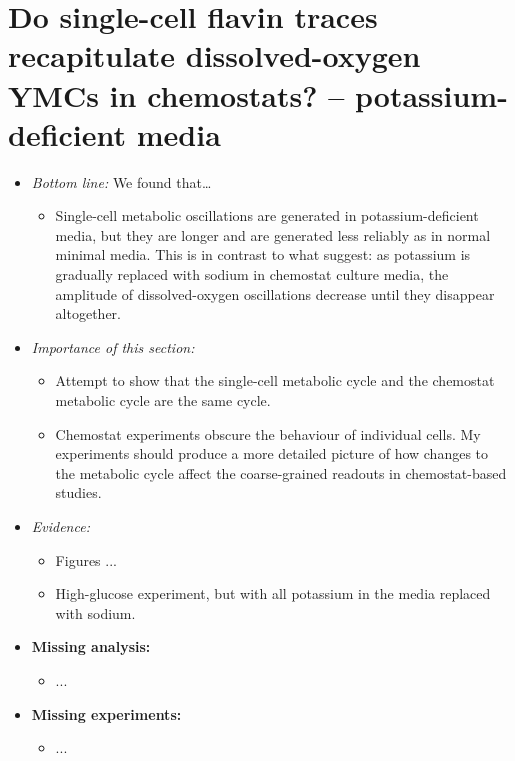 \section{Do single-cell flavin traces recapitulate dissolved-oxygen YMCs in chemostats? -- potassium-deficient media}
\label{sec:biology-potassium_deficient}
\begin{itemize}
\item \emph{Bottom line:} We found that\ldots{}
\begin{itemize}
\item Single-cell metabolic oscillations are generated in potassium-deficient media, but they are longer and are generated less reliably as in normal minimal media.  This is in contrast to what \cite{oneillEukaryoticCellBiology2020} suggest: as potassium is gradually replaced with sodium in chemostat culture media, the amplitude of dissolved-oxygen oscillations decrease until they disappear altogether.
\end{itemize}
\item \emph{Importance of this section:}
\begin{itemize}
\item Attempt to show that the single-cell metabolic cycle and the chemostat metabolic cycle are the same cycle.
\item Chemostat experiments obscure the behaviour of individual cells.  My experiments should produce a more detailed picture of how changes to the metabolic cycle affect the coarse-grained readouts in chemostat-based studies.
\end{itemize}
\end{itemize}
\begin{itemize}
\item \emph{Evidence:}
\begin{itemize}
\item Figures ...
\item High-glucose experiment, but with all potassium in the media replaced with sodium.
\end{itemize}

\item \textbf{Missing analysis:}
\begin{itemize}
\item ...
\end{itemize}
\item \textbf{Missing experiments:}
\begin{itemize}
\item ...
\end{itemize}
\end{itemize}

